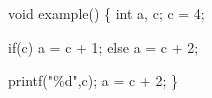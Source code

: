 \begin{minipage}{2in}
  \begin{AVerb}[numbers=left,gobble=4]
    void example() \{
      int a, c;
      c = 4; \label{hoopl_lst1_assign_c}

      if(c) 
        a = c + 1; \label{hoopl_lst1_assign_a}
      else
        a = c + 2; \label{hoopl_lst1_assign_a2}

      printf("\%d",c); \label{hoopl_lst1_print}
      a = c + 2; \label{hoopl_lst1_add}
    \}
  \end{AVerb}
\end{minipage} 
